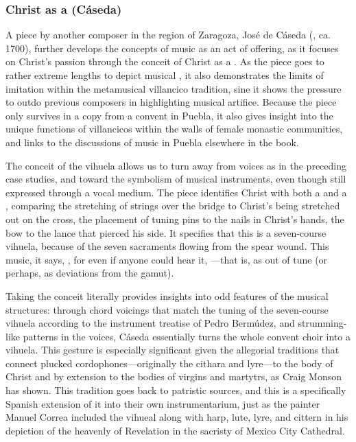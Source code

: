\documentclass[tt]{vcbook-proposal}
\begin{document}
\subsubsection{Christ as a  (Cáseda)}

A piece by another composer in the region of Zaragoza, José de Cáseda (, ca. 1700), further develops the concepts of music as an act of offering, as it focuses on Christ's passion through the conceit of Christ as a . 
As the piece goes to rather extreme lengths to depict musical , it also demonstrates the limits of imitation within the metamusical villancico tradition, sine it shows the pressure to outdo previous composers in highlighting musical artifice.
Because the piece only survives in a copy from a convent in Puebla, it also gives insight into the unique functions of villancicos within the walls of female monastic communities, and links to the discussions of music in Puebla elsewhere in the book.

The conceit of the vihuela allows us to turn away from voices as in the preceding case studies, and toward the symbolism of musical instruments, even though still expressed through a vocal medium.
The piece identifies Christ with both a  and a , comparing the stretching of strings over the bridge to Christ's being stretched out on the cross, the placement of tuning pins to the nails in Christ's hands, the bow to the lance that pierced his side.
It specifies that this is a seven-course vihuela, because of the seven sacraments flowing from the spear wound.
This music, it says, , for even if anyone could hear it, ---that is, as out of tune (or perhaps, as  deviations from the gamut). 

Taking the conceit literally provides insights into odd features of the musical structures: through chord voicings that match the tuning of the seven-course vihuela according to the instrument treatise of Pedro Bermúdez, and strumming-like patterns in the voices, Cáseda essentially turns the whole convent choir into a vihuela.
This gesture is especially significant given the allegorial traditions that connect plucked cordophones---originally the cithara and lyre---to the body of Christ and by extension to the bodies of virgins and martytrs, as Craig Monson has shown.
This tradition goes back to patristic sources, and this is a specifically Spanish extension of it into their own instrumentarium, just as the painter Manuel Correa included the vihueal along with harp, lute, lyre, and cittern in his depiction of the heavenly  of Revelation in the sacristy of Mexico City Cathedral.
\end{document}
